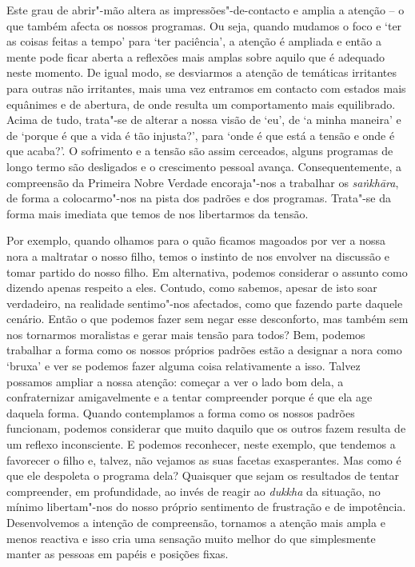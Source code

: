 Este grau de abrir"-mão altera as impressões"-de-contacto e amplia a atenção --
o que também afecta os nossos programas. Ou seja, quando mudamos o foco e `ter
as coisas feitas a tempo' para `ter paciência', a atenção é ampliada e então a
mente pode ficar aberta a reflexões mais amplas sobre aquilo que é adequado
neste momento. De igual modo, se desviarmos a atenção de temáticas irritantes
para outras não irritantes, mais uma vez entramos em contacto com estados mais
equânimes e de abertura, de onde resulta um comportamento mais equilibrado.
Acima de tudo, trata"-se de alterar a nossa visão de `eu', de `a minha maneira'
e de `porque é que a vida é tão injusta?', para `onde é que está a tensão e onde
é que acaba?'. O sofrimento e a tensão são assim cerceados, alguns programas de
longo termo são desligados e o crescimento pessoal avança. Consequentemente, a
compreensão da Primeira Nobre Verdade encoraja"-nos a trabalhar os
\emph{saṅkhāra}, de forma a colocarmo"-nos na pista dos padrões e dos programas.
Trata"-se da forma mais imediata que temos de nos libertarmos da tensão.

Por exemplo, quando olhamos para o quão ficamos magoados por ver a nossa nora a
maltratar o nosso filho, temos o instinto de nos envolver na discussão e tomar
partido do nosso filho. Em alternativa, podemos considerar o assunto como
dizendo apenas respeito a eles. Contudo, como sabemos, apesar de isto soar
verdadeiro, na realidade sentimo"-nos afectados, como que fazendo parte daquele
cenário. Então o que podemos fazer sem negar esse desconforto, mas também sem
nos tornarmos moralistas e gerar mais tensão para todos? Bem, podemos trabalhar
a forma como os nossos próprios padrões estão a designar a nora como `bruxa' e
ver se podemos fazer alguma coisa relativamente a isso. Talvez possamos ampliar
a nossa atenção: começar a ver o lado bom dela, a confraternizar amigavelmente e
a tentar compreender porque é que ela age daquela forma. Quando contemplamos a
forma como os nossos padrões funcionam, podemos considerar que muito daquilo que
os outros fazem resulta de um reflexo inconsciente. E podemos reconhecer, neste
exemplo, que tendemos a favorecer o filho e, talvez, não vejamos as suas facetas
exasperantes. Mas como é que ele despoleta o programa dela? Quaisquer que sejam
os resultados de tentar compreender, em profundidade, ao invés de reagir ao
\emph{dukkha} da situação, no mínimo libertam"-nos do nosso próprio sentimento
de frustração e de impotência. Desenvolvemos a intenção de compreensão, tornamos
a atenção mais ampla e menos reactiva e isso cria uma sensação muito melhor do
que simplesmente manter as pessoas em papéis e posições fixas.

